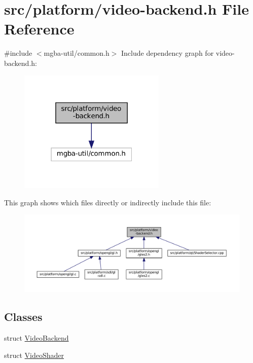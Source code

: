 \hypertarget{video-backend_8h}{}\section{src/platform/video-\/backend.h File Reference}
\label{video-backend_8h}
{\ttfamily \#include $<$mgba-\/util/common.\+h$>$}\newline
Include dependency graph for video-\/backend.h\+:
\nopagebreak
\begin{figure}[H]
\begin{center}
\leavevmode
\includegraphics[width=199pt]{video-backend_8h__incl}
\end{center}
\end{figure}
This graph shows which files directly or indirectly include this file\+:
\nopagebreak
\begin{figure}[H]
\begin{center}
\leavevmode
\includegraphics[width=350pt]{video-backend_8h__dep__incl}
\end{center}
\end{figure}
\subsection*{Classes}
\begin{DoxyCompactItemize}
\item 
struct \mbox{\hyperlink{struct_video_backend}{Video\+Backend}}
\item 
struct \mbox{\hyperlink{video-backend_8h_struct_video_shader}{Video\+Shader}}
\end{DoxyCompactItemize}
